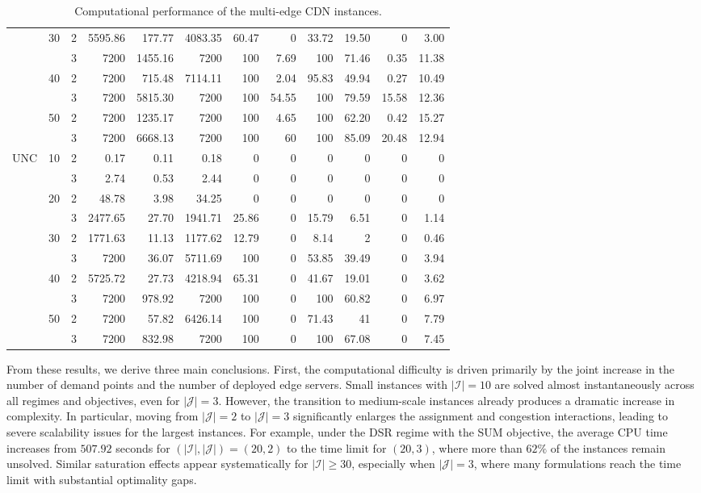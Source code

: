 \documentclass[a4paper,11pt,reqno]{amsart}
\newcommand{\J}{\mathcal{J}}
\begin{document}
\begin{table}[ht]
\begin{tabular}{p{0.7cm}cc|rrr|rrr|rrr}
 & \multirow{2}{*}{30} & 2 & 5595.86 & 177.77 & 4083.35 & 60.47 & 0 & 33.72 & 19.50 & 0 & 3.00 \\
 &  & 3 &7200 & 1455.16 &7200 & 100 & 7.69 & 100 & 71.46 & 0.35 & 11.38 \\
 & \multirow{2}{*}{40} & 2 &7200 & 715.48 & 7114.11 & 100 & 2.04 & 95.83 & 49.94 & 0.27 & 10.49 \\
 &  & 3 &7200 & 5815.30 &7200 & 100 & 54.55 & 100 & 79.59 & 15.58 & 12.36 \\
 & \multirow{2}{*}{50} & 2 &7200 & 1235.17 &7200 & 100 & 4.65 & 100 & 62.20 & 0.42 & 15.27 \\
 &  & 3 &7200 & 6668.13 &7200 & 100 & 60 & 100 & 85.09 & 20.48 & 12.94 \\\midrule
\multirow{10}{*}{UNC} & \multirow{2}{*}{10} & 2 & 0.17 & 0.11 & 0.18 & 0 & 0 & 0 & 0 & 0 & 0 \\
 &  & 3 & 2.74 & 0.53 & 2.44 & 0 & 0 & 0 & 0 & 0 & 0 \\
 & \multirow{2}{*}{20} & 2 & 48.78 & 3.98 & 34.25 & 0 & 0 & 0 & 0 & 0 & 0 \\
 &  & 3 & 2477.65 & 27.70 & 1941.71 & 25.86 & 0 & 15.79 & 6.51 & 0 & 1.14 \\
 & \multirow{2}{*}{30} & 2 & 1771.63 & 11.13 & 1177.62 & 12.79 & 0 & 8.14 & 2 & 0 & 0.46 \\
 &  & 3 &7200 & 36.07 & 5711.69 & 100 & 0 & 53.85 & 39.49 & 0 & 3.94 \\
 & \multirow{2}{*}{40} & 2 & 5725.72 & 27.73 & 4218.94 & 65.31 & 0 & 41.67 & 19.01 & 0 & 3.62 \\
 &  & 3 &7200 & 978.92 &7200 & 100 & 0 & 100 & 60.82 & 0 & 6.97 \\
 & \multirow{2}{*}{50} & 2 &7200 & 57.82 & 6426.14 & 100 & 0 & 71.43 & 41 & 0 & 7.79 \\
 &  & 3 &7200 & 832.98 &7200 & 100 & 0 & 100 & 67.08 & 0 & 7.45 \\
\bottomrule
\end{tabular}
\caption{Computational performance of the multi-edge CDN instances.}
\label{tab:multi_cpu_combined}
\end{table}


From these results, we derive three main conclusions. First, the computational difficulty is driven primarily by the joint increase in the number of demand points and the number of deployed edge servers. Small instances with $|\mathcal I|=10$ are solved almost instantaneously across all regimes and objectives, even for $|\J|=3$. However, the transition to medium-scale instances already produces a dramatic increase in complexity. In particular, moving from $|\J|=2$ to $|\J|=3$ significantly enlarges the assignment and congestion interactions, leading to severe scalability issues for the largest instances. For example, under the DSR regime with the SUM objective, the average CPU time increases from $507.92$ seconds for $(|\mathcal I|,|\J|)=(20,2)$ to the time limit for $(20,3)$, where more than $62\%$ of the instances remain unsolved. Similar saturation effects appear systematically for $|\mathcal I|\geq 30$, especially when $|\J|=3$, where many formulations reach the time limit with substantial optimality gaps.
\end{document}
